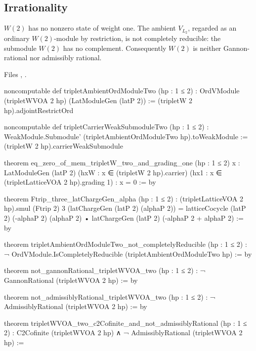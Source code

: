 \subsection{Irrationality}

\begin{theorem}\label{l18:thm:irrtwo}
$W(2)$ has no nonzero state of weight one. The ambient $V_{L_2}$, regarded as an ordinary $W(2)$-module by
restriction, is not completely reducible: the submodule $W(2)$ has no complement. Consequently $W(2)$ is
neither Gannon-rational nor admissibly rational.
\end{theorem}
\noindent Files ,
.
\begin{leancode}
noncomputable def tripletAmbientOrdModuleTwo (hp : 1 ≤ 2) :
    OrdVModule (tripletWVOA 2 hp) (LatModuleGen (latP 2)) :=
  (tripletW 2 hp).adjointRestrictOrd

noncomputable def tripletCarrierWeakSubmoduleTwo (hp : 1 ≤ 2) :
    WeakModule.Submodule' (tripletAmbientOrdModuleTwo hp).toWeakModule :=
  (tripletW 2 hp).carrierWeakSubmodule
\end{leancode}
\begin{leancode}
theorem eq_zero_of_mem_tripletW_two_and_grading_one (hp : 1 ≤ 2)
    {x : LatModuleGen (latP 2)} (hxW : x ∈ (tripletW 2 hp).carrier)
    (hx1 : x ∈ (tripletLatticeVOA 2 hp).grading 1) : x = 0 := by

theorem Ftrip_three_latChargeGen_alpha (hp : 1 ≤ 2) :
    (tripletLatticeVOA 2 hp).smul (Ftrip 2) 3
        (latChargeGen (latP 2) (alphaP 2))
      = latticeCocycle (latP 2) (-alphaP 2) (alphaP 2) •
          latChargeGen (latP 2) (-alphaP 2 + alphaP 2) := by

theorem tripletAmbientOrdModuleTwo_not_completelyReducible (hp : 1 ≤ 2) :
    ¬ OrdVModule.IsCompletelyReducible (tripletAmbientOrdModuleTwo hp) := by

theorem not_gannonRational_tripletWVOA_two (hp : 1 ≤ 2) :
    ¬ GannonRational (tripletWVOA 2 hp) := by

theorem not_admissiblyRational_tripletWVOA_two (hp : 1 ≤ 2) :
    ¬ AdmissiblyRational (tripletWVOA 2 hp) := by

theorem tripletWVOA_two_c2Cofinite_and_not_admissiblyRational (hp : 1 ≤ 2) :
    C2Cofinite (tripletWVOA 2 hp) ∧ ¬ AdmissiblyRational (tripletWVOA 2 hp) :=
\end{leancode}
